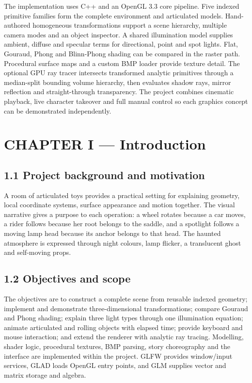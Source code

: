 \documentclass[12pt,a4paper]{article}
\begin{document}
The implementation uses C++ and an OpenGL 3.3 core pipeline. Five indexed primitive families form the complete environment and articulated models. Hand-authored homogeneous transformations support a scene hierarchy, multiple camera modes and an object inspector. A shared illumination model supplies ambient, diffuse and specular terms for directional, point and spot lights. Flat, Gouraud, Phong and Blinn-Phong shading can be compared in the raster path. Procedural surface maps and a custom BMP loader provide texture detail. The optional GPU ray tracer intersects transformed analytic primitives through a median-split bounding volume hierarchy, then evaluates shadow rays, mirror reflection and straight-through transparency. The project combines cinematic playback, live character takeover and full manual control so each graphics concept can be demonstrated independently.

\clearpage
\tableofcontents
\clearpage
\section*{CHAPTER I --- Introduction}
\subsection*{1.1 Project background and motivation}
A room of articulated toys provides a practical setting for explaining geometry, local coordinate systems, surface appearance and motion together. The visual narrative gives a purpose to each operation: a wheel rotates because a car moves, a rider follows because her root belongs to the saddle, and a spotlight follows a moving lamp head because its anchor belongs to that head. The haunted atmosphere is expressed through night colours, lamp flicker, a translucent ghost and self-moving props.

\subsection*{1.2 Objectives and scope}
The objectives are to construct a complete scene from reusable indexed geometry; implement and demonstrate three-dimensional transformations; compare Gouraud and Phong shading; explain three light types through one illumination equation; animate articulated and rolling objects with elapsed time; provide keyboard and mouse interaction; and extend the renderer with analytic ray tracing. Modelling, shader logic, procedural textures, BMP parsing, story choreography and the interface are implemented within the project. GLFW provides window/input services, GLAD loads OpenGL entry points, and GLM supplies vector and matrix storage and algebra.
\end{document}
